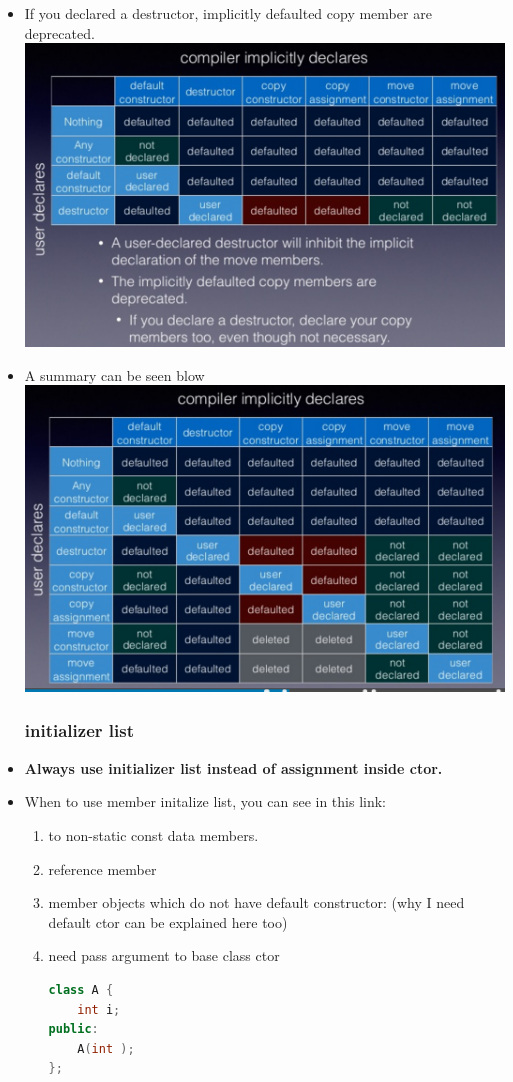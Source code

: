 \documentclass[a4paper,12pt,twoside]{book}
\begin{document}
\begin{itemize}
\item If you declared a destructor, implicitly defaulted copy member are deprecated.  \\
\includegraphics[scale=0.6]{pics/sm4.png} \newline


\item A summary can be seen blow \\
\includegraphics[scale=0.6]{pics/sm3.png} \newline


\subsubsection{initializer list}
\item \textbf{Always use initializer list instead of assignment inside ctor.}

\item When to use member initalize list, you can see in this link:
\begin{enumerate}
\item to non-static const data members.
\item reference member
\item  member objects which do not have default constructor: (why I need default ctor can be explained here too)
\item need pass argument to base class ctor
\begin{lstlisting}[frame=single, language=c++]
class A {
    int i;
public:
    A(int );
};


\end{lstlisting}
\end{enumerate}
\end{itemize}
\end{document}
